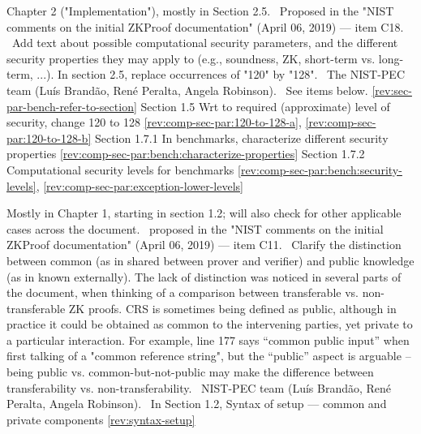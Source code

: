 Chapter 2 ("Implementation"), mostly in Section 2.5.
\newcol \ccontext\ Proposed in the "NIST comments on the initial ZKProof documentation" (April 06, 2019) --- item C18.
				\propContrib\ Add text about possible computational security parameters, and the different security properties they may apply to (e.g., soundness, ZK, short-term vs. long-term, ...). In section 2.5, replace occurrences of "120" by "128".
\newcol {}
\newcol \contributors\ The NIST-PEC team (Luís Brandão, René Peralta, Angela Robinson).
				\Chan\ See items below.
\newcol \ref{rev:sec-par-bench-refer-to-section}
\rowendL
Section 1.5
\newcol \newcol \newcol Wrt to required (approximate) level of security, change 120 to 128
\newcol \ref{rev:comp-sec-par:120-to-128-a}, \ref{rev:comp-sec-par:120-to-128-b}
\rowendL
Section 1.7.1
\newcol \newcol \newcol In benchmarks, characterize different security properties
\newcol \ref{rev:comp-sec-par:bench:characterize-properties}
\rowendL
Section 1.7.2
\newcol \newcol \newcol Computational security levels for benchmarks
\newcol \ref{rev:comp-sec-par:bench:security-levels}, \ref{rev:comp-sec-par:exception-lower-levels}
\rowendL
\myendIssue



\label{it:syntax-setup}
Mostly in Chapter 1, starting in section 1.2; will also check for other applicable cases across the document.
\newcol \ccontext\ proposed in the "NIST comments on the initial ZKProof documentation" (April 06, 2019) --- item C11.
				\propContrib\ Clarify the distinction between common (as in shared between prover and verifier) and public knowledge (as in known externally). The lack of distinction was noticed in several parts of the document, when thinking of a comparison between transferable vs. non-transferable ZK proofs. CRS is sometimes being defined as public, although in practice it could be obtained as common to the intervening parties, yet private to a particular interaction. For example, line 177 says ``common public input'' when first talking of a "common reference string", but the ``public'' aspect is arguable – being public vs. common-but-not-public may make the difference between transferability vs. non-transferability.
\newcol {}
\newcol \contributors\ NIST-PEC team (Luís Brandão, René Peralta, Angela Robinson).
				\Chan\ In Section 1.2, Syntax of setup --- common and private components
\newcol \ref{rev:syntax-setup}
\rowendL
\myendIssue



